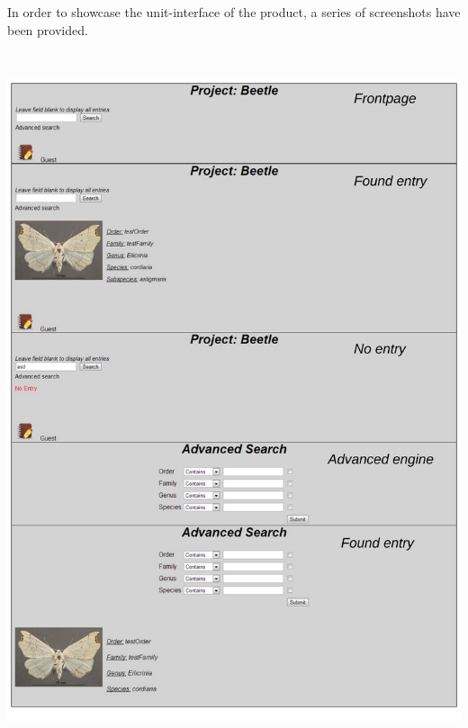 \documentclass[12pt,a4paper]{article}
\begin{document}
In order to showcase the unit-interface of the product, a series of screenshots have been provided.

\includegraphics[height=205mm]{UI1.pdf}
\newpage
\end{document}
